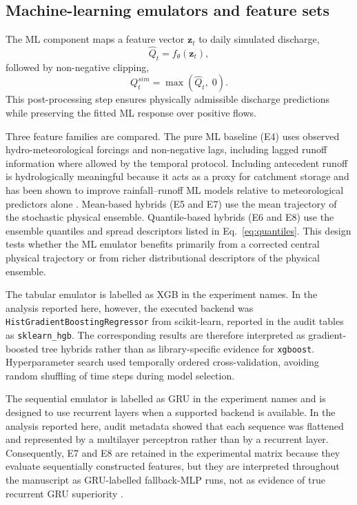 \documentclass[a4paper,fleqn]{cas-sc}
\begin{document}
\subsection{Machine-learning emulators and feature sets}
\label{subsec:emulator}

The ML component maps a feature vector $\mathbf{z}_t$ to daily simulated
discharge,
\begin{equation}
\hat{Q}_t = f_\theta(\mathbf{z}_t),
\label{eq:emulator}
\end{equation}
followed by non-negative clipping,
\begin{equation}
Q^{sim}_t = \max(\hat{Q}_t,\;0).
\label{eq:ml-clipping}
\end{equation}
This post-processing step ensures physically admissible discharge
predictions while preserving the fitted ML response over positive
flows.

Three feature families are compared. The pure ML baseline (E4) uses
observed hydro-meteorological forcings and non-negative lags, including
lagged runoff information where allowed by the temporal protocol.
Including antecedent runoff is hydrologically meaningful because it
acts as a proxy for catchment storage and has been shown to improve
rainfall--runoff ML models relative to meteorological predictors alone
\citep{adnan2021comparison}. Mean-based hybrids (E5 and E7) use the
mean trajectory of the stochastic physical ensemble. Quantile-based
hybrids (E6 and E8) use the ensemble quantiles and spread descriptors
listed in Eq.~\ref{eq:quantiles}. This design tests whether the ML
emulator benefits primarily from a corrected central physical trajectory
or from richer distributional descriptors of the physical ensemble.

The tabular emulator is labelled as XGB in the experiment names. In the
analysis reported here, however, the executed backend was
\texttt{HistGradientBoostingRegressor} from scikit-learn, reported in
the audit tables as \texttt{sklearn\_hgb}. The corresponding results
are therefore interpreted as gradient-boosted tree hybrids rather than
as library-specific evidence for \texttt{xgboost}. Hyperparameter search
used temporally ordered cross-validation, avoiding random shuffling of
time steps during model selection.

The sequential emulator is labelled as GRU in the experiment names and
is designed to use recurrent layers when a supported backend is
available. In the analysis reported here, audit metadata showed that each
sequence was flattened and represented by a multilayer perceptron rather
than by a recurrent layer. Consequently, E7 and E8 are retained in
the experimental matrix because they evaluate sequentially constructed
features, but they are interpreted throughout the manuscript as
GRU-labelled fallback-MLP runs, not as evidence of true recurrent GRU
superiority \citep{kratzert2018rainfall,kratzert2019towards}.
\end{document}
